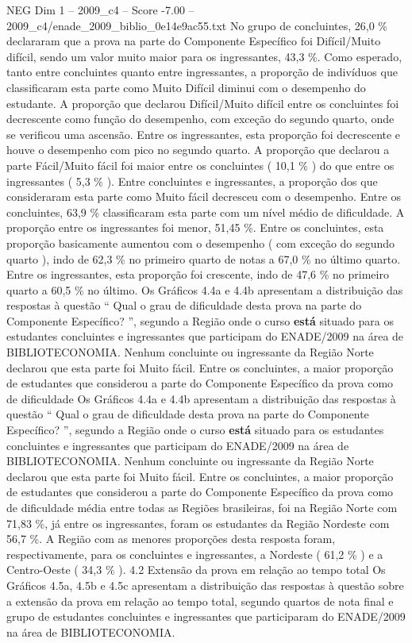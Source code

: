 \begin{textsample}{NEG Dim 1 – 2009\_c4 – Score -7.00 – 2009\_c4/enade\_2009\_biblio\_0e14e9ac55.txt}
No grupo de concluintes, 26,0 \% declararam que a prova na parte do Componente Específico foi Difícil/Muito difícil, sendo um valor muito maior para os ingressantes, 43,3 \%.
Como esperado, tanto entre concluintes quanto entre ingressantes, a proporção de indivíduos que classificaram esta parte como Muito Difícil diminui com o desempenho do estudante.
A proporção que declarou Difícil/Muito difícil entre os concluintes foi decrescente como função do desempenho, com exceção do segundo quarto, onde se verificou uma ascensão.
Entre os ingressantes, esta proporção foi decrescente e houve o desempenho com pico no segundo quarto.
A proporção que declarou a parte Fácil/Muito fácil foi maior entre os concluintes ( 10,1 \% ) do que entre os ingressantes ( 5,3 \% ).
Entre concluintes e ingressantes, a proporção dos que consideraram esta parte como Muito fácil decresceu com o desempenho.
Entre os concluintes, 63,9 \% classificaram esta parte com um nível médio de dificuldade.
A proporção entre os ingressantes foi menor, 51,45 \%.
Entre os concluintes, esta proporção basicamente aumentou com o desempenho ( com exceção do segundo quarto ), indo de 62,3 \% no primeiro quarto de notas a 67,0 \% no último quarto.
Entre os ingressantes, esta proporção foi crescente, indo de 47,6 \% no primeiro quarto a 60,5 \% no último.
Os Gráficos 4.4a e 4.4b apresentam a distribuição das respostas à questão “ Qual o grau de dificuldade desta prova na parte do Componente Específico? ”, segundo a Região onde o curso \textbf{está} situado para os estudantes concluintes e ingressantes que participam do ENADE/2009 na área de BIBLIOTECONOMIA.
Nenhum concluinte ou ingressante da Região Norte declarou que esta parte foi Muito fácil.
Entre os concluintes, a maior proporção de estudantes que considerou a parte do Componente Específico da prova como de dificuldade Os Gráficos 4.4a e 4.4b apresentam a distribuição das respostas à questão “ Qual o grau de dificuldade desta prova na parte do Componente Específico? ”, segundo a Região onde o curso \textbf{está} situado para os estudantes concluintes e ingressantes que participam do ENADE/2009 na área de BIBLIOTECONOMIA.
Nenhum concluinte ou ingressante da Região Norte declarou que esta parte foi Muito fácil.
Entre os concluintes, a maior proporção de estudantes que considerou a parte do Componente Específico da prova como de dificuldade média entre todas as Regiões brasileiras, foi na Região Norte com 71,83 \%, já entre os ingressantes, foram os estudantes da Região Nordeste com 56,7 \%.
A Região com as menores proporções desta resposta foram, respectivamente, para os concluintes e ingressantes, a Nordeste ( 61,2 \% ) e a Centro-Oeste ( 34,3 \% ). 4.2 Extensão da prova em relação ao tempo total Os Gráficos 4.5a, 4.5b e 4.5c apresentam a distribuição das respostas à questão sobre a extensão da prova em relação ao tempo total, segundo quartos de nota final e grupo de estudantes concluintes e ingressantes que participaram do ENADE/2009 na área de BIBLIOTECONOMIA.

\end{textsample}
